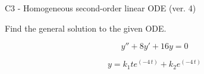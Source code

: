 \begin{exercise}
  \begin{exerciseTitle}C3 - Homogeneous second-order linear ODE (ver. 4)\end{exerciseTitle}
  \begin{exerciseStatement}
    
Find the general solution to the given ODE.

    
\[y''+8y'+16y = 0\]

  \end{exerciseStatement}
  \begin{exerciseAnswer}
    
\[y= k_{1} t e^{\left(-4 \, t\right)} + k_{2} e^{\left(-4 \, t\right)}\]

  \end{exerciseAnswer}
\end{exercise}